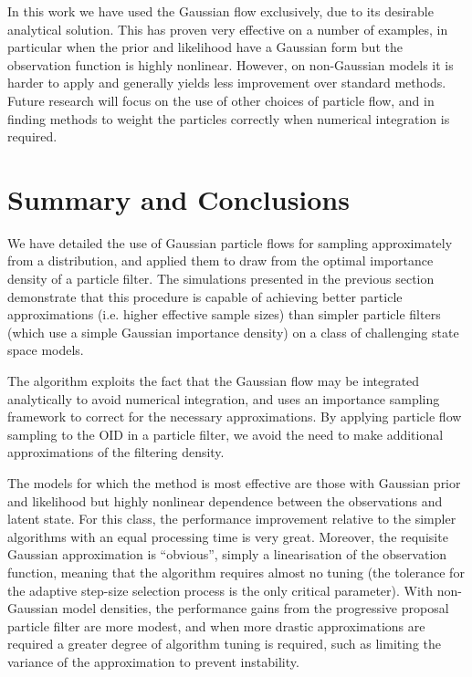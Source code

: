 \documentclass{article}
\begin{document}
In this work we have used the Gaussian flow exclusively, due to its desirable analytical solution. This has proven very effective on a number of examples, in particular when the prior and likelihood have a Gaussian form but the observation function is highly nonlinear. However, on non-Gaussian models it is harder to apply and generally yields less improvement over standard methods. Future research will focus on the use of other choices of particle flow, and in finding methods to weight the particles correctly when numerical integration is required.




\section{Summary and Conclusions}

We have detailed the use of Gaussian particle flows for sampling approximately from a distribution, and applied them to draw from the optimal importance density of a particle filter. The simulations presented in the previous section demonstrate that this procedure is capable of achieving better particle approximations (i.e. higher effective sample sizes) than simpler particle filters (which use a simple Gaussian importance density) on a class of challenging state space models.

The algorithm exploits the fact that the Gaussian flow may be integrated analytically to avoid numerical integration, and uses an importance sampling framework to correct for the necessary approximations. By applying particle flow sampling to the OID in a particle filter, we avoid the need to make additional approximations of the filtering density.

The models for which the method is most effective are those with Gaussian prior and likelihood but highly nonlinear dependence between the observations and latent state. For this class, the performance improvement relative to the simpler algorithms with an equal processing time is very great. Moreover, the requisite Gaussian approximation is ``obvious'', simply a linearisation of the observation function, meaning that the algorithm requires almost no tuning (the tolerance for the adaptive step-size selection process is the only critical parameter). With non-Gaussian model densities, the performance gains from the progressive proposal particle filter are more modest, and when more drastic approximations are required a greater degree of algorithm tuning is required, such as limiting the variance of the approximation to prevent instability.





%
\end{document}
